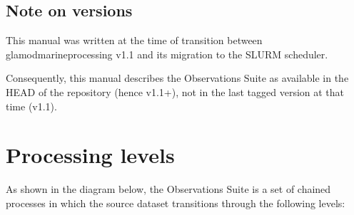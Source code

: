 \documentclass[letterpaper,10pt,english]{sphinxmanual}
\begin{document}
\section{Note on versions}
\label{\detokenize{index:note-on-versions}}\label{\detokenize{index:versions}}
This manual was written at the time of transition between glamod\sphinxhyphen{}marine\sphinxhyphen{}processing
v1.1 and its migration to the SLURM scheduler.

Consequently, this manual describes the Observations Suite as available in the
HEAD of the repository (hence v1.1+), not in the last tagged version at that
time (v1.1).


\chapter{Processing levels}
\label{\detokenize{index:processing-levels}}
As shown in the diagram below, the Observations Suite is a set of chained
processes in which the source dataset transitions through the following levels:
\end{document}

